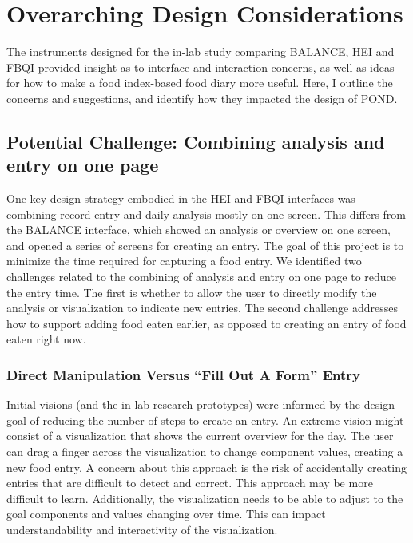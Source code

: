 \section{Overarching Design Considerations}

The instruments designed for the in-lab study comparing BALANCE, HEI and FBQI provided insight as to interface and interaction concerns, as well as ideas for how to make a food index-based food diary more useful. Here, I outline the concerns and suggestions, and identify how they impacted the design of POND. 


\subsection{Potential Challenge: Combining analysis and entry on one page} 

One key design strategy embodied in the HEI and FBQI interfaces was combining record entry and daily analysis mostly on one screen. This differs from the BALANCE interface, which showed an analysis or overview on one screen, and opened a series of screens for creating an entry. The goal of this project is to minimize the time required for capturing a food entry. We identified two challenges related to the combining of analysis and entry on one page to reduce the entry time. The first is whether to allow the user to directly modify the analysis or visualization to indicate new entries. The second challenge addresses how to support adding food eaten earlier, as opposed to creating an entry of food eaten right now. 


\subsubsection{Direct Manipulation Versus ``Fill Out A Form'' Entry}
Initial visions (and the in-lab research prototypes) were informed by the design goal of reducing the number of steps to create an entry. An extreme vision might consist of a visualization that shows the current overview for the day. The user can drag a finger across the visualization to change component values, creating a new food entry. A concern about this approach is the risk of accidentally creating entries that are difficult to detect and correct.  This approach may be more difficult to learn. Additionally, the visualization needs to be able to adjust to the goal components and values changing over time. This can impact understandability and interactivity of the visualization. 

